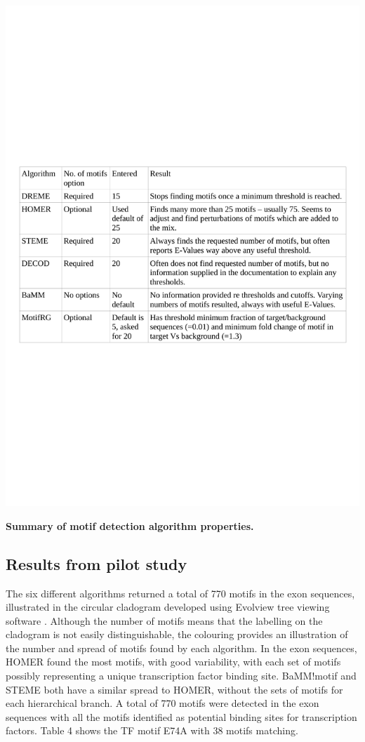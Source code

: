 \documentclass[12pt, onecolumn, oneside]{gsajnl}
\begin{document}
\begin{table}[!h]
     \includegraphics[width= \textwidth]{plots/algorithm_summary.pdf} 
    \caption{{\bf Summary of motif detection algorithm properties.}}
    \label{fig: motif_summary}
\end{table}

\subsection{Results from pilot study}

The six different algorithms returned a total of 770 motifs in the exon sequences, illustrated in the circular cladogram developed using Evolview tree viewing software  \citep{he2016evolview}. Although the number of motifs means that the labelling on the cladogram is not easily distinguishable, the colouring provides an 
illustration of the number and spread of motifs found by each algorithm. In the exon sequences, HOMER found the most motifs, with good variability, with 
each set of motifs possibly representing a unique transcription factor binding site. BaMM!motif and STEME both have a similar spread to HOMER, without the sets of motifs for each hierarchical 
branch. A total of 770 motifs were detected in the exon sequences with all the motifs identified as potential binding sites for transcription factors. 
Table 4 shows the TF motif E74A with 38 motifs matching.
\end{document}
